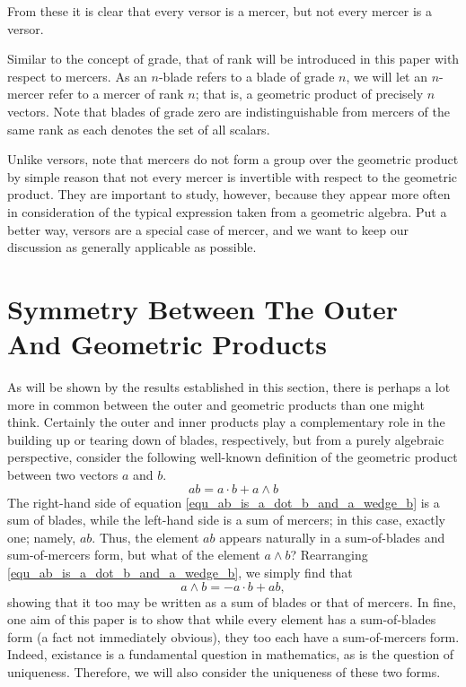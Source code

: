 \documentclass{birkjour}
\theoremstyle{definition}
\theoremstyle{remark}
\numberwithin{equation}{section}
\begin{document}
From these it is clear that every versor is a mercer, but not every mercer is a versor.

Similar to the concept of grade, that of rank will be introduced in this paper with respect to mercers.  As an $n$-blade
refers to a blade of grade $n$, we will let an $n$-mercer refer to a mercer of rank $n$; that is, a geometric
product of precisely $n$ vectors.  Note that blades of grade zero
are indistinguishable from mercers of the same rank as each denotes the set of all scalars.

Unlike versors, note that mercers do not form a group over the geometric product by simple reason that not every
mercer is invertible with respect to the geometric product.  They are important to study, however,
because they appear more often in consideration of the typical expression taken from a geometric algebra.
Put a better way, versors are a special case of mercer, and we want to keep our discussion as generally applicable as possible.

\section{Symmetry Between The Outer And Geometric Products}

As will be shown by the results established in this section, there is perhaps a lot more in
common between the outer and geometric products than one might think.  Certainly the outer and
inner products play a complementary role in the building up or tearing down of blades, respectively, but from a
purely algebraic perspective, consider the following well-known definition of the geometric product
between two vectors $a$ and $b$.
\begin{equation}\label{equ_ab_is_a_dot_b_and_a_wedge_b}
ab = a\cdot b + a\wedge b
\end{equation}
The right-hand side of equation \eqref{equ_ab_is_a_dot_b_and_a_wedge_b} is a sum of blades, while the left-hand side is a sum of mercers;
in this case, exactly one; namely, $ab$.  Thus, the element $ab$ appears naturally in a sum-of-blades and
sum-of-mercers form, but what of the element $a\wedge b$?  Rearranging \eqref{equ_ab_is_a_dot_b_and_a_wedge_b}, we simply find that
\begin{equation}\label{equ_a_wedge_b_is_neg_a_dot_b_and_ab}
a\wedge b = -a\cdot b + ab,
\end{equation}
showing that it too may be written as a sum of blades or that of mercers.  In fine, one aim of this paper
is to show that while every element has a sum-of-blades form (a fact not immediately obvious),
they too each have a sum-of-mercers form.
Indeed, existance is a fundamental question in mathematics, as is the question of uniqueness.  Therefore,
we will also consider the uniqueness of these two forms.
\end{document}
